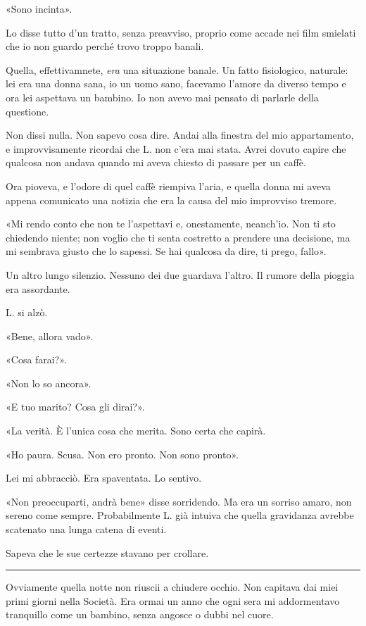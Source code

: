\documentclass[a4paper,10pt]{memoir}
\begin{document}
«Sono incinta».

Lo disse tutto d'un tratto, senza preavviso, proprio come accade nei film smielati che io non guardo perché trovo troppo
banali.

Quella, effettivamnete, \emph{era} una situazione banale. Un fatto fisiologico, naturale: lei era una donna sana, io un
uomo sano, facevamo l'amore da diverso tempo e ora lei aspettava un bambino. Io non avevo mai pensato di parlarle della
questione.

Non dissi nulla. Non sapevo cosa dire. Andai alla finestra del mio appartamento, e improvvisamente ricordai che L. non
c'era mai stata. Avrei dovuto capire che qualcosa non andava quando mi aveva chiesto di passare per un caffè.

Ora pioveva, e l'odore di quel caffè riempiva l'aria, e quella donna mi aveva appena comunicato una notizia che era la
causa del mio improvviso tremore.

«Mi rendo conto che non te l'aspettavi e, onestamente, neanch'io. Non ti sto chiedendo niente; non voglio che ti senta
costretto a prendere una decisione, ma mi sembrava giusto che lo sapessi. Se hai qualcosa da dire, ti prego, fallo».

Un altro lungo silenzio. Nessuno dei due guardava l'altro. Il rumore della pioggia era assordante.

L. si alzò.

«Bene, allora vado».

«Cosa farai?».

«Non lo so ancora».

«E tuo marito? Cosa gli dirai?».

«La verità. È l'unica cosa che merita. Sono certa che capirà.

«Ho paura. Scusa. Non ero pronto. Non sono pronto».

Lei mi abbracciò. Era spaventata. Lo sentivo.

«Non preoccuparti, andrà bene» disse sorridendo. Ma era un sorriso amaro, non sereno come sempre. Probabilmente L. già
intuiva che quella gravidanza avrebbe scatenato una lunga catena di eventi.

Sapeva che le sue certezze stavano per crollare.

\plainbreak{1}

Ovviamente quella notte non riuscii a chiudere occhio. Non capitava dai miei primi giorni nella Società. Era ormai un
anno che ogni sera mi addormentavo tranquillo come un bambino, senza angosce o dubbi nel cuore.
\end{document}
